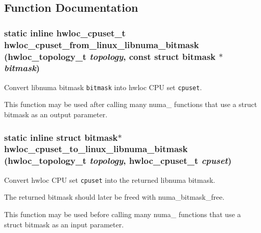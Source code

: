\subsection{Function Documentation}
\hypertarget{group__hwlocality__linux__libnuma__bitmask_ga7ac171ac41f209bfbc710ca690affe0}{
\subsubsection[{hwloc\_\-cpuset\_\-from\_\-linux\_\-libnuma\_\-bitmask}]{\setlength{\rightskip}{0pt plus 5cm}static inline {\bf hwloc\_\-cpuset\_\-t} hwloc\_\-cpuset\_\-from\_\-linux\_\-libnuma\_\-bitmask ({\bf hwloc\_\-topology\_\-t} {\em topology}, \/  const struct bitmask $\ast$ {\em bitmask})}}
\label{group__hwlocality__linux__libnuma__bitmask_ga7ac171ac41f209bfbc710ca690affe0}


Convert libnuma bitmask {\tt bitmask} into hwloc CPU set {\tt cpuset}. 

This function may be used after calling many numa\_\- functions that use a struct bitmask as an output parameter. \hypertarget{group__hwlocality__linux__libnuma__bitmask_g66720508d673173aea250095be22822d}{
\subsubsection[{hwloc\_\-cpuset\_\-to\_\-linux\_\-libnuma\_\-bitmask}]{\setlength{\rightskip}{0pt plus 5cm}static inline struct bitmask$\ast$ hwloc\_\-cpuset\_\-to\_\-linux\_\-libnuma\_\-bitmask ({\bf hwloc\_\-topology\_\-t} {\em topology}, \/  {\bf hwloc\_\-cpuset\_\-t} {\em cpuset})}}
\label{group__hwlocality__linux__libnuma__bitmask_g66720508d673173aea250095be22822d}


Convert hwloc CPU set {\tt cpuset} into the returned libnuma bitmask. 

The returned bitmask should later be freed with numa\_\-bitmask\_\-free.

This function may be used before calling many numa\_\- functions that use a struct bitmask as an input parameter. 
